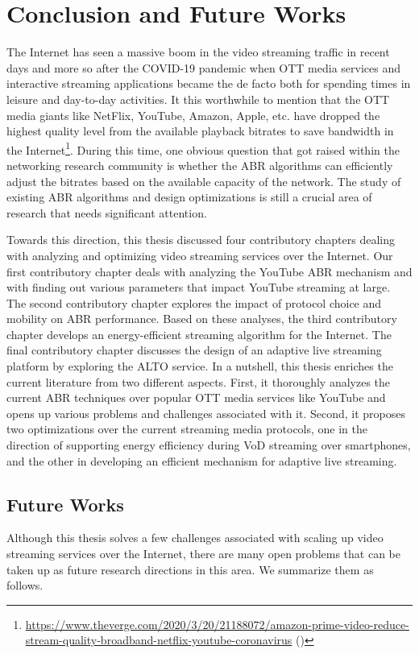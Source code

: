 \chapter{Conclusion and Future Works}
The Internet has seen a massive boom in the video streaming traffic in recent days and more so after the COVID-19 pandemic when \ac{OTT} media services and interactive streaming applications became the de facto both for spending times in leisure and day-to-day activities. It this worthwhile to mention that the \ac{OTT} media giants like NetFlix, YouTube, Amazon, Apple, etc. have dropped the highest quality level from the available playback bitrates to save bandwidth in the Internet\footnote{\url{https://www.theverge.com/2020/3/20/21188072/amazon-prime-video-reduce-stream-quality-broadband-netflix-youtube-coronavirus} (\lastaccessedtoday)}. During this time, one obvious question that got raised within the networking research community is whether the \ac{ABR} algorithms can efficiently adjust the bitrates based on the available capacity of the network. The study of existing \ac{ABR} algorithms and design optimizations is still a crucial area of research that needs significant attention.  

Towards this direction, this thesis discussed four contributory chapters dealing with analyzing and optimizing video streaming services over the Internet. Our first contributory chapter deals with analyzing the YouTube \ac{ABR} mechanism and with finding out various parameters that impact YouTube streaming at large. The second contributory chapter explores the impact of protocol choice and mobility on \ac{ABR} performance. Based on these analyses, the third contributory chapter develops an energy-efficient streaming algorithm for the Internet. The final contributory chapter discusses the design of an adaptive live streaming platform by exploring the \ac{ALTO} service. In a nutshell, this thesis enriches the current literature from two different aspects. First, it thoroughly analyzes the current \ac{ABR} techniques over popular \ac{OTT} media services like YouTube and opens up various problems and challenges associated with it. Second, it proposes two optimizations over the current streaming media protocols, one in the direction of supporting energy efficiency during VoD streaming over smartphones, and the other in developing an efficient mechanism for adaptive live streaming.

\section{Future Works}
Although this thesis solves a few challenges associated with scaling up video streaming services over the Internet, there are many open problems that can be taken up as future research directions in this area. We summarize them as follows. 

